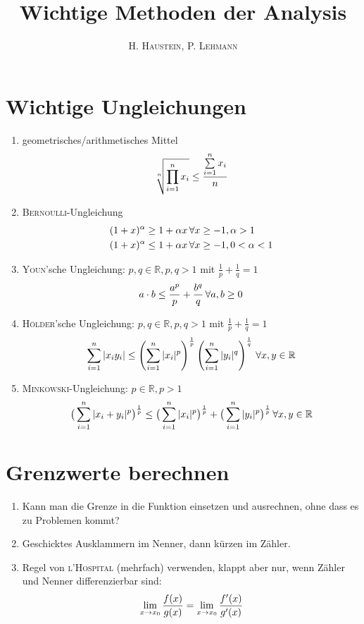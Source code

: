 \documentclass[ngerman,a4paper]{article}
\title{\textbf{Wichtige Methoden der Analysis}}
\author{\textsc{H. Haustein}, \textsc{P. Lehmann}}
\begin{document}
\maketitle

\section{Wichtige Ungleichungen}
\begin{enumerate}[label=\textbf{\arabic*.}]
	\item geometrisches/arithmetisches Mittel
	\begin{align}
		\sqrt[n]{\prod_{i=1}^n x_i}\le \frac{\sum\limits_{i=1}^n x_i}{n}\notag
	\end{align}
	\item \textsc{Bernoulli}-Ungleichung
	\begin{align}
		(1+x)^\alpha &\ge 1 + \alpha x\,\forall x\ge -1, \alpha > 1 \notag \\
		(1+x)^\alpha &\le 1+\alpha x \,\forall x\ge -1, 0 < \alpha < 1\notag
	\end{align}
	\item \textsc{Youn}'sche Ungleichung: $p,q\in\mathbb{R}, p,q > 1$ mit $\frac{1}{p}+\frac{1}{q}=1$
	\begin{align}
		a\cdot b \le \frac{a^p}{p} + \frac{b^q}{q}\,\forall a,b\ge 0\notag
	\end{align}
	\item \textsc{Hölder}'sche Ungleichung: $p,q\in\mathbb{R}, p,q > 1$ mit $\frac{1}{p}+\frac{1}{q}=1$
	\begin{align}
		\sum_{i=1}^{n} |x_i y_i| \le \left(\sum_{i=1}^n |x_i|^p \right)^{\frac{1}{p}}\left(\sum_{i=1}^n |y_i|^q\right)^{\frac{1}{q}}\,\forall x,y\in\mathbb{R}\notag
	\end{align}
	\item \textsc{Minkowski}-Ungleichung: $p\in\mathbb{R}, p>1$
	\begin{align}
		\big(\sum_{i=1}^{n} \vert x_i + y_i \vert^p \big)^\frac{1}{p} \leq \big(\sum_{i=1}^{n} \vert x_i \vert^p \big)^\frac{1}{p} + \big(\sum_{i=1}^{n} \vert y_i \vert^p \big)^\frac{1}{p}\,\forall x,y\in \mathbb{R}\notag
	\end{align}
\end{enumerate}

\section{Grenzwerte berechnen}
\begin{enumerate}[label=\textbf{\arabic*.}]
	\item Kann man die Grenze in die Funktion einsetzen und ausrechnen, ohne dass es zu Problemen kommt? 
	\item Geschicktes Ausklammern im Nenner, dann kürzen im Zähler.
	\item Regel von \textsc{l'Hospital} (mehrfach) verwenden, klappt aber nur, wenn Zähler und Nenner differenzierbar sind:
	\begin{align}
	\lim\limits_{x\to x_0}\frac{f(x)}{g(x)}=\lim\limits_{x\to x_0}\frac{f'(x)}{g'(x)}\notag
	\end{align}
\end{enumerate}
\end{document}
